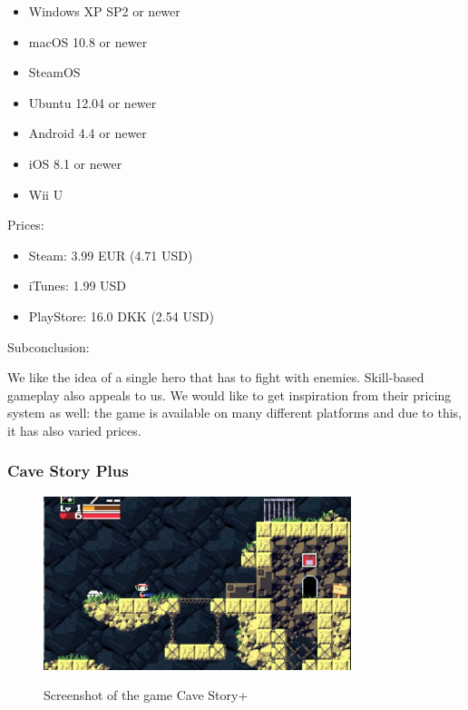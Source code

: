\documentclass[12p]{article}
\begin{document}
\begin{itemize}
    \item Windows XP SP2 or newer
    \item macOS 10.8 or newer
    \item SteamOS
    \item Ubuntu 12.04 or newer
    \item Android 4.4 or newer
    \item iOS 8.1 or newer
    \item Wii U
\end{itemize}

Prices:

\begin{itemize}
  \item Steam: 3.99 EUR (4.71 USD)
  \item iTunes: 1.99 USD
  \item PlayStore: 16.0 DKK (2.54 USD)
\end{itemize}

Subconclusion:

We like the idea of a single hero that has to fight with enemies. Skill-based gameplay also appeals to us. We would like to get inspiration from their pricing system as well: the game is available on many different platforms and due to this, it has also varied prices.



\newpage
\subsubsection[Cave Story Plus]{Cave Story Plus \cite{CaveStoryPlusSteam}}

\begin{figure}[ht]
  \center
  \includegraphics[width=0.8\textwidth]{StateOfTheArtScreenshots/cave_story_plus}
  \label{sec:StateOfTheArt_Screenshots_CaveStoryPlus}
  \caption{Screenshot of the game Cave Story+ \cite{CaveStoryPlusScreenshot}}
\end{figure}
\end{document}
